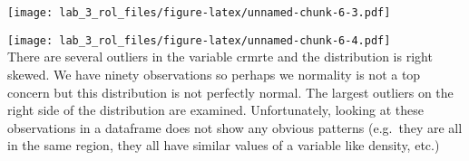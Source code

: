 \documentclass[
]{article}
\newenvironment{Shaded}{\begin{snugshade}}{\end{snugshade}}
\newcommand{\FloatTok}[1]{\textcolor[rgb]{0.00,0.00,0.81}{#1}}
\newcommand{\KeywordTok}[1]{\textcolor[rgb]{0.13,0.29,0.53}{\textbf{#1}}}
\newcommand{\NormalTok}[1]{#1}
\newcommand{\OperatorTok}[1]{\textcolor[rgb]{0.81,0.36,0.00}{\textbf{#1}}}
\newcommand{\StringTok}[1]{\textcolor[rgb]{0.31,0.60,0.02}{#1}}
\begin{document}
\texttt{[image: lab\_3\_rol\_files/figure-latex/unnamed-chunk-6-3.pdf]}

\begin{Shaded}
\end{Shaded}

\texttt{[image: lab\_3\_rol\_files/figure-latex/unnamed-chunk-6-4.pdf]}\\
There are several outliers in the variable crmrte and the distribution
is right skewed. We have ninety observations so perhaps we normality is
not a top concern but this distribution is not perfectly normal. The
largest outliers on the right side of the distribution are examined.
Unfortunately, looking at these observations in a dataframe does not
show any obvious patterns (e.g.~they are all in the same region, they
all have similar values of a variable like density, etc.)

\begin{Shaded}
\end{Shaded}
\end{document}
